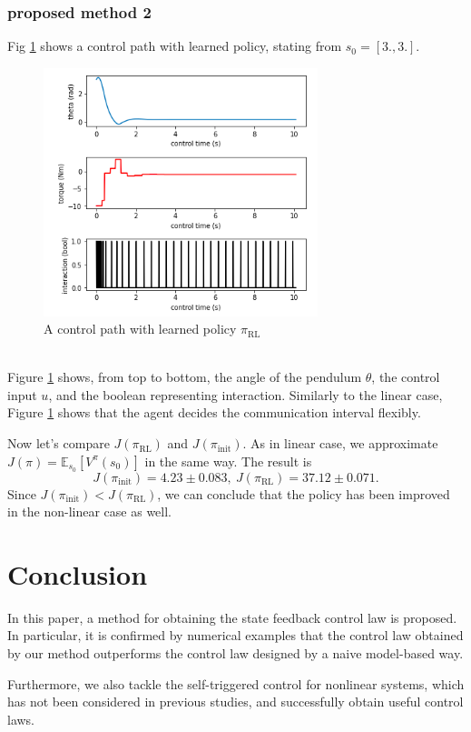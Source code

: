 \documentclass[english, dvipdfmx]{ampmt}             %
\newcommand{\expect}{\mathbb{E}}
\begin{document}
\subsubsection{proposed method 2}
Fig \ref{path_1} shows a control path with learned policy, stating from $s_0 = [3., 3.]$.
\begin{figure}[h]
	\centering
 	\includegraphics[width=8cm]{path_1.png}
 	\caption{A control path with learned policy $\pi_{\textrm{RL}}$} \label{path_1}
\end{figure}\\
Figure \ref{path_1} shows, from top to bottom, the angle of the pendulum $\theta$, the control input $u$, and the boolean representing interaction. Similarly to the linear case, Figure \ref{path_1} shows that the agent decides the communication interval flexibly.\par
Now let's compare $J(\pi_{\textrm{RL}})$ and $J(\pi_{\textrm{init}})$. As in linear case, we approximate $J(\pi) = \expect_{s_0}[V^{\pi}(s_0)]$ in the same way. The result is
\begin{equation}
	J(\pi_{\textrm{init}}) = 4.23 \pm 0.083,~J(\pi_{\textrm{RL}}) = 37.12 \pm 0.071 \label{compare_policy}.
\end{equation}
Since $J(\pi_{\textrm{init}}) < J(\pi_{\textrm{RL}})$, we can conclude that the policy has been improved in the non-linear case as well.


\section{Conclusion}
In this paper, a method for obtaining the state feedback control law is proposed. In particular, it is confirmed by numerical examples that the control law obtained by our method outperforms the control law designed by a naive model-based way. \par 
Furthermore, we also tackle the self-triggered control for nonlinear systems, which has not been considered in previous studies, and successfully obtain useful control laws. 
\end{document}
